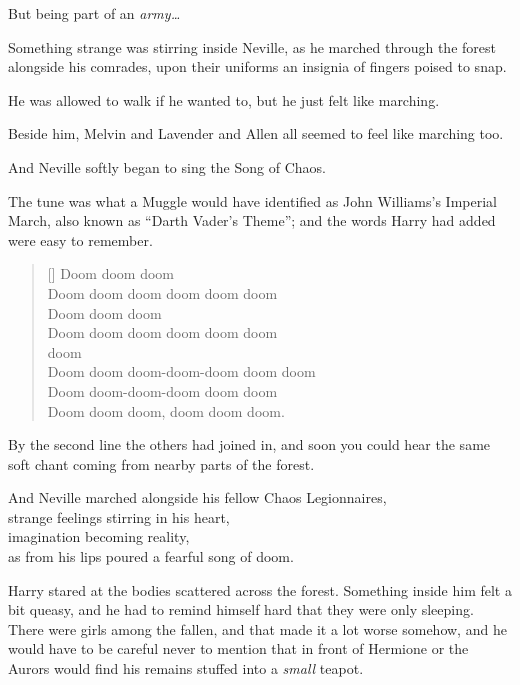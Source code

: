 But being part of an \emph{army…}

Something strange was stirring inside Neville, as he marched through the forest alongside his comrades, upon their uniforms an insignia of fingers poised to snap.

He was allowed to walk if he wanted to, but he just felt like marching.

Beside him, Melvin and Lavender and Allen all seemed to feel like marching too.

And Neville softly began to sing the Song of Chaos.

The tune was what a Muggle would have identified as John Williams’s Imperial March, also known as “Darth Vader’s Theme”; and the words Harry had added were easy to remember.

\baselineskip\settowidth{\versewidth}{Doom doom doom-doom-doom doom doom} \begin{verse}[\versewidth] Doom doom doom\\ Doom doom doom doom doom doom\\ Doom doom doom\\ Doom doom doom doom doom doom\\  doom \\ Doom doom doom-doom-doom doom doom\\ Doom doom-doom-doom doom doom\\ Doom doom doom, doom doom doom. \end{verse}\baselineskip

By the second line the others had joined in, and soon you could hear the same soft chant coming from nearby parts of the forest.

And Neville marched alongside his fellow Chaos Legionnaires,\\
strange feelings stirring in his heart,\\
imagination becoming reality,\\
as from his lips poured a fearful song of doom.

\later

Harry stared at the bodies scattered across the forest. Something inside him felt a bit queasy, and he had to remind himself hard that they were only sleeping. There were girls among the fallen, and that made it a lot worse somehow, and he would have to be careful never to mention that in front of Hermione or the Aurors would find his remains stuffed into a \emph{small} teapot.

